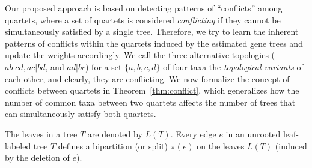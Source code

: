 \documentclass[runningheads]{llncs}
\begin{document}
Our proposed approach is based on detecting patterns of ``conflicts'' among quartets, where a set of quartets is considered \textit{conflicting} if they cannot be simultaneously satisfied by a single tree. Therefore, we try to learn the inherent patterns of conflicts within the quartets induced by the estimated gene trees and update the weights accordingly. We call the three alternative topologies ($ab|cd, ac|bd$, and $ad|bc$) for a set $\{a,b,c,d\}$ of four taxa the \textit{topological variants} of each other, and clearly, they are conflicting. We now formalize the concept of conflicts between quartets in Theorem~\ref{thm:conflict}, which generalizes how the number of common taxa between two quartets affects the number of trees that can simultaneously satisfy both quartets.


The leaves in a tree $T$ are denoted by $L(T)$.
Every edge $e$ in an unrooted leaf-labeled tree $T$ defines a bipartition (or split) $\pi(e)$ on the leaves $L(T)$ (induced by the deletion of $e$). 

\vspace{-4pt}
\end{document}
